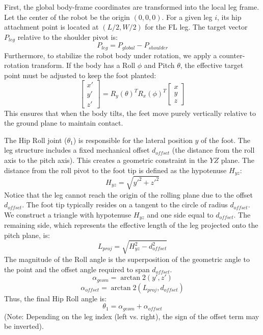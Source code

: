 \documentclass[pdflatex,sn-mathphys-num]{sn-jnl}%
\theoremstyle{thmstyleone}%
\theoremstyle{thmstyletwo}%
\theoremstyle{thmstylethree}%
\begin{document}
First, the global body-frame coordinates are transformed into the local leg frame. Let the center of the robot be the origin $(0,0,0)$. For a given leg $i$, its hip attachment point is located at $(L/2, W/2)$ for the FL leg. The target vector $P_{leg}$ relative to the shoulder pivot is:
\begin{equation}
    P_{leg} = P_{global} - P_{shoulder}
\end{equation}
Furthermore, to stabilize the robot body under rotation, we apply a counter-rotation transform. If the body has a Roll $\phi$ and Pitch $\theta$, the effective target point must be adjusted to keep the foot planted:
\begin{equation}
    \begin{bmatrix} x' \\ y' \\ z' \end{bmatrix} = R_y(\theta)^T R_x(\phi)^T \begin{bmatrix} x \\ y \\ z \end{bmatrix}
\end{equation}
This ensures that when the body tilts, the feet move purely vertically relative to the ground plane to maintain contact.

The Hip Roll joint ($\theta_1$) is responsible for the lateral position $y$ of the foot. The leg structure includes a fixed mechanical offset $d_{offset}$ (the distance from the roll axis to the pitch axis). This creates a geometric constraint in the $YZ$ plane. The distance from the roll pivot to the foot tip is defined as the hypotenuse $H_{yz}$:
\begin{equation}
    H_{yz} = \sqrt{y'^2 + z'^2}
\end{equation}
Notice that the leg cannot reach the origin of the rolling plane due to the offset $d_{offset}$. The foot tip typically resides on a tangent to the circle of radius $d_{offset}$. We construct a triangle with hypotenuse $H_{yz}$ and one side equal to $d_{offset}$. The remaining side, which represents the effective length of the leg projected onto the pitch plane, is:
\begin{equation}
    L_{proj} = \sqrt{H_{yz}^2 - d_{offset}^2}
\end{equation}
The magnitude of the Roll angle is the superposition of the geometric angle to the point and the offset angle required to span $d_{offset}$.
\begin{equation}
    \alpha_{geom} = \arctan2(y', z')
\end{equation}
\begin{equation}
    \alpha_{offset} = \arctan2(L_{proj}, d_{offset})
\end{equation}
Thus, the final Hip Roll angle is:
\begin{equation}
    \theta_1 = \alpha_{geom} + \alpha_{offset}
\end{equation}
(Note: Depending on the leg index (left vs. right), the sign of the offset term may be inverted).
\end{document}
